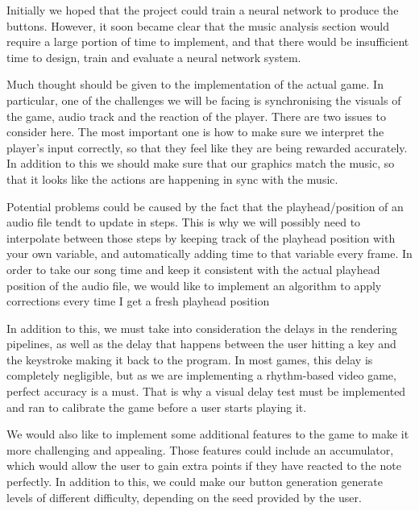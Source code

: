 Initially we hoped that the project could train a neural network to produce the buttons. However, it soon became clear that the music analysis section would require a large portion of time to implement, and that there would be insufficient time to design, train and evaluate a neural network system.

Much thought should be given to the implementation of the actual game. In particular, one of the challenges we will be facing is synchronising the visuals of the game, audio track and the reaction of the player. There are two issues to consider here. The most important one is how to make sure we interpret the player's input correctly, so that they feel like they are being rewarded accurately. In addition to this we should make sure that our graphics match the music, so that it looks like the actions are happening in sync with the music.

Potential problems could be caused by the fact that the playhead/position of an audio file tendt to update in steps. This is why we will possibly need to interpolate between those steps by keeping track of the playhead position with your own variable, and automatically adding time to that variable every frame. 
In order to take our song time and keep it consistent with the actual playhead position of the audio file, we would like to implement an algorithm to apply corrections every time I get a fresh playhead position

In addition to this, we must take into consideration the delays in the rendering pipelines, as well as the delay that happens between the user hitting a key and the keystroke making it back to the program. In most games, this delay is completely negligible, but as we are implementing a rhythm-based video game, perfect accuracy is a must. That is why a visual delay test must be implemented and ran to calibrate the game before a user starts playing it.

We would also like to implement some additional features to the game to make it more challenging and appealing. Those features could include an accumulator, which would allow the user to gain extra points if they have reacted to the note perfectly. In addition to this, we could make our button generation generate levels of different difficulty, depending on the seed provided by the user. 

